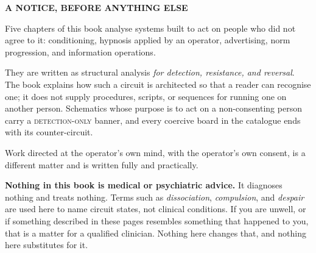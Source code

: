\thispagestyle{empty}
\vspace*{1.5in}
\begin{center}
\begin{minipage}{0.80\textwidth}
\small
\begin{center}\textbf{A NOTICE, BEFORE ANYTHING ELSE}\end{center}
\vspace{6pt}
\noindent
Five chapters of this book analyse systems built to act on people who did not
agree to it: conditioning, hypnosis applied by an operator, advertising, norm
progression, and information operations.

\vspace{6pt}
\noindent
They are written as structural analysis \emph{for detection, resistance, and
reversal}. The book explains how such a circuit is architected so that a reader
can recognise one; it does not supply procedures, scripts, or sequences for
running one on another person. Schematics whose purpose is to act on a
non-consenting person carry a \textsc{detection-only} banner, and every coercive
board in the catalogue ends with its counter-circuit.

\vspace{6pt}
\noindent
Work directed at the operator's own mind, with the operator's own consent, is a
different matter and is written fully and practically.

\vspace{6pt}
\noindent
\textbf{Nothing in this book is medical or psychiatric advice.} It diagnoses
nothing and treats nothing. Terms such as \emph{dissociation}, \emph{compulsion},
and \emph{despair} are used here to name circuit states, not clinical
conditions. If you are unwell, or if something described in these pages
resembles something that happened to you, that is a matter for a qualified
clinician. Nothing here changes that, and nothing here substitutes for it.
\end{minipage}
\end{center}
\vspace*{\fill}
\cleardoublepage

